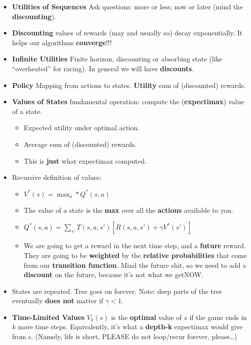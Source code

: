 \documentclass[twocolumn]{article}
\begin{document}
\begin{itemize}
\item \textbf{Utilities of Sequences} Ask questions: more or less; now
  or later (mind the \textbf{discounting}). 
\item \textbf{Discounting} values of rewards (may and usually so)
  decay exponentially. It helps our algorithms \textbf{converge}!!!
\item \textbf{Infinite Utilities} Finite horizon, discounting or
  absorbing state (like ``overheated'' for racing). In general we will
  have \textbf{discounts}.
\item \textbf{Policy} Mapping from actions to states. \textbf{Utility}
  sum of (discounted) rewards.
\item \textbf{Values of States} fundamental operation: compute the
  (\textbf{expectimax}) value of a state. 
  \begin{itemize}
  \item Expected utility under optimal action.
  \item Average sum of (discounted) rewards.
  \item This is \textbf{just} what expectimax computed.
  \end{itemize}
\item Recursive definition of values:
  \begin{itemize}
  \item $V^{*}(s)={\displaystyle\max_{a}}*Q^{*}(s,a)$
  \item The value of a state is the \textbf{max} over all the
    \textbf{actions} available to you.
  \item $Q^{*}(s,a)=\sum_{s'}T(s,a,s')[R(s,a,s')+\gamma V^{*}(s')]$
  \item We are going to get a reward in the next time step, and a
    \textbf{future} reward. They are going to be \textbf{weighted} by
    the \textbf{relative probabilities} that come from our
    \textbf{transition function}. Mind the future shit, so we need to
    add a \textbf{discount} on the future, because it's not what we
    get\@ NOW.
  \end{itemize}
\item States are repeated. Tree goes on forever. Note: deep parts of
  the tree eventually \textbf{does not} matter if $\gamma < 1$.
\item \textbf{Time-Limited Values} $V_{k}(s)$ is the \textbf{optimal}
  value of $s$ if the game ends in $k$ more time steps. Equivalently,
  it's what a \textbf{depth-k} expectimax would give from s. (Namely,
  life is short, PLEASE do not loop/recur forever, please\ldots)

\end{itemize}
\end{document}
